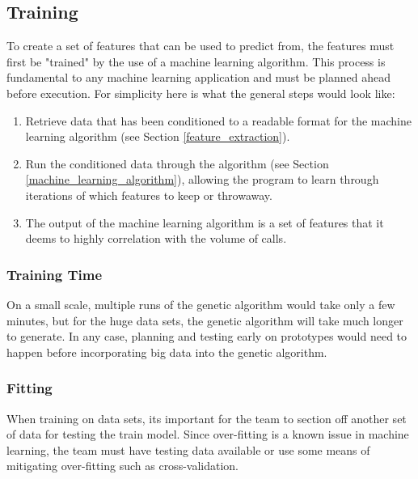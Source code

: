 \documentclass[onecolumn, draftclsnofoot,10pt, compsoc]{IEEEtran}
\begin{document}
\begin{singlespace}
    \subsection{Training}
    To create a set of features that can be used to predict from, the features must first be "trained" by the use of a machine learning algorithm. 
    This process is fundamental to any machine learning application and must be planned ahead before execution.
    For simplicity here is what the general steps would look like:
    \begin{enumerate}
        \item Retrieve data that has been conditioned to a readable format for the machine learning algorithm (see Section \ref{feature_extraction}).
        \item Run the conditioned data through the algorithm (see Section \ref{machine_learning_algorithm}), allowing the program to learn through iterations of which features to keep or throwaway.
        \item The output of the machine learning algorithm is a set of features that it deems to highly correlation with the volume of calls.
    \end{enumerate}
    \subsubsection{Training Time} 
    On a small scale, multiple runs of the genetic algorithm would take only a few minutes, but for the huge data sets, the genetic algorithm will take much longer to generate.
    In any case, planning and testing early on prototypes would need to happen before incorporating big data into the genetic algorithm.
    \subsubsection{Fitting}
    When training on data sets, its important for the team to section off another set of data for testing the train model.
    Since over-fitting is a known issue in machine learning, the team must have testing data available or use some means of mitigating over-fitting such as cross-validation.


\end{singlespace}
\end{document}
